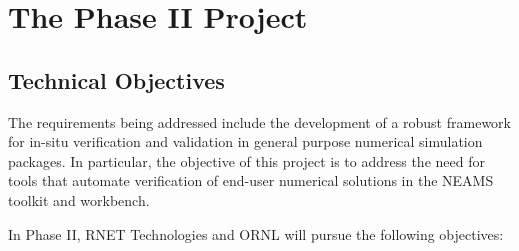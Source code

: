 
\section{The Phase II Project}
\label{sec:phaseII}


\subsection{Technical Objectives}

The requirements being addressed include the development of a robust framework 
for in-situ verification and validation in general purpose numerical simulation 
packages. In particular, the objective of this project is to address the need
for tools that automate verification of end-user numerical solutions in the 
NEAMS toolkit and workbench. 

In Phase II, RNET Technologies and ORNL will pursue the following objectives:


